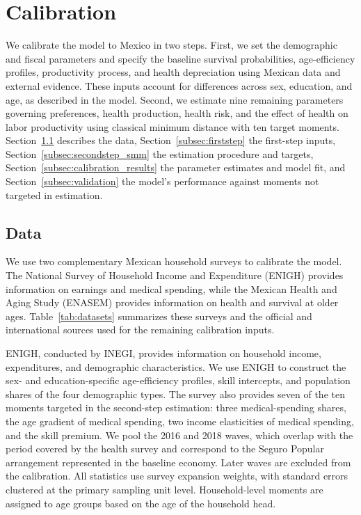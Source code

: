 \documentclass[12pt,a4paper]{article}
\begin{document}
\section{Calibration}
\label{sec:calibration}

We calibrate the model to Mexico in two steps. First, we set the demographic and fiscal parameters and specify the baseline survival probabilities, age-efficiency profiles, productivity process, and health depreciation using Mexican data and external evidence. These inputs account for differences across sex, education, and age, as described in the model. Second, we estimate nine remaining parameters governing preferences, health production, health risk, and the effect of health on labor productivity using classical minimum distance with ten target moments. Section~\ref{subsec:data} describes the data, Section~\ref{subsec:firststep} the first-step inputs, Section~\ref{subsec:secondstep_smm} the estimation procedure and targets, Section~\ref{subsec:calibration_results} the parameter estimates and model fit, and Section~\ref{subsec:validation} the model's performance against moments not targeted in estimation.


\subsection{Data}
\label{subsec:data}

We use two complementary Mexican household surveys to calibrate the model. The National Survey of Household Income and Expenditure (ENIGH) provides information on earnings and medical spending, while the Mexican Health and Aging Study (ENASEM) provides information on health and survival at older ages. Table~\ref{tab:datasets} summarizes these surveys and the official and international sources used for the remaining calibration inputs.

ENIGH, conducted by INEGI, provides information on household income, expenditures, and demographic characteristics. We use ENIGH to construct the sex- and education-specific age-efficiency profiles, skill intercepts, and population shares of the four demographic types. The survey also provides seven of the ten moments targeted in the second-step estimation: three medical-spending shares, the age gradient of medical spending, two income elasticities of medical spending, and the skill premium. We pool the 2016 and 2018 waves, which overlap with the period covered by the health survey and correspond to the Seguro Popular arrangement represented in the baseline economy. Later waves are excluded from the calibration. All statistics use survey expansion weights, with standard errors clustered at the primary sampling unit level. Household-level moments are assigned to age groups based on the age of the household head.
\end{document}
